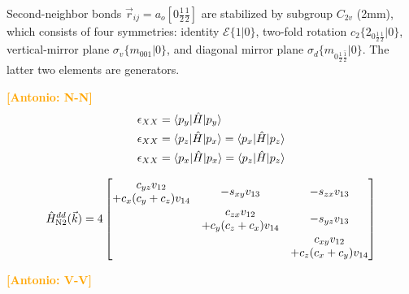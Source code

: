\documentclass[twocolumn,showpacs,preprintnumbers,superscriptaddress,prb,floatfix,aps,10pt]{revtex4-1}
\newcommand{\abmei}[1]{\textcolor{orange}{ \bf [Antonio: #1] }}
\newcommand*{\ham}{\hat{H}}
\newcommand*{\id}{\mathcal{E}}
\newcommand*{\bondvec}{\vec{r}_{ij}}
\newcommand{\seitz}[2]{\{#1|#2\}}
\begin{document}

Second-neighbor bonds $\bondvec = a_o[0\frac{1}{2}\frac{1}{2}]$ are stabilized by subgroup $C_{2v}$ (2mm), which consists of four symmetries: identity $\id \seitz{1}{0}$, two-fold rotation $c_2 \seitz{ 2_{0\frac{1}{2}\frac{1}{2}} }{0}$, vertical-mirror plane $\sigma_v \seitz{m_{001}}{0}$, and diagonal mirror plane $\sigma_d \seitz{m_{0\frac{1}{2}\bar{\frac{1}{2}}}}{0}$. The latter two elements are generators.

\abmei{N-N}
\begin{align}
\epsilon_{XX} &
= \braket{p_{y} | \ham | p_y } \\
\epsilon_{XX} &
= \braket{p_{z} | \ham | p_x }
= \braket{p_{x} | \ham | p_z } \\
\epsilon_{XX} &
= \braket{p_{x} | \ham | p_x }
= \braket{p_{z} | \ham | p_z } \\
\end{align}



\begin{equation}
\ham_{\textrm{N2}}^{dd}(\vec{k}) = 4
\begin{bmatrix}
              c_{yz} v_{12} & \multirow{2}{*}{$-s_{xy} v_{13}$} & \multirow{2}{*}{$-s_{zx} v_{13}$}  \\
+c_{x} (c_{y}+c_{z}) v_{14} &                                   &                                    \\
\multirow{2}{*}{ }          &               c_{zx} v_{12}       & \multirow{2}{*}{$-s_{yz} v_{13}$}  \\
                            & +c_{y} (c_{z}+c_{x}) v_{14}       &                                    \\
\multirow{2}{*}{ }          & \multirow{2}{*}{ }                &          c_{xy} v_{12}             \\ 
                            &                                   &        +c_{z} (c_{x}+c_{y}) v_{14} \\
\end{bmatrix}
\end{equation}



\abmei{V-V}
\end{document}
